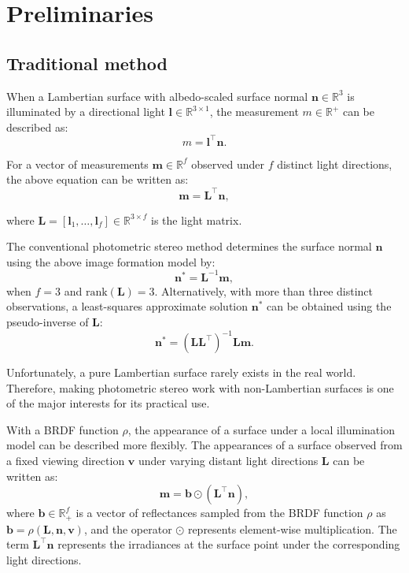 \section{Preliminaries}

\subsection{Traditional method}

When a Lambertian surface with albedo-scaled surface normal $\mathbf{n} \in \mathbb{R}^3$ is illuminated by a directional light $\mathbf{l} \in \mathbb{R}^{3 \times 1}$, the measurement $m \in \mathbb{R}^+$ can be described as:
\[ m = \mathbf{l}^\top \mathbf{n}. \]

For a vector of measurements $\mathbf{m} \in \mathbb{R}^f$ observed under $f$ distinct light directions, the above equation can be written as:
\[ \mathbf{m} = \mathbf{L}^\top \mathbf{n}, \]

where $\mathbf{L} = [\mathbf{l}_1, \ldots, \mathbf{l}_f] \in \mathbb{R}^{3 \times f}$ is the light matrix.

The conventional photometric stereo method determines the surface normal $\mathbf{n}$ using the above image formation model by:
\[ \mathbf{n}^* = \mathbf{L}^{-1} \mathbf{m}, \]
when $f = 3$ and $\text{rank}(\mathbf{L}) = 3$. Alternatively, with more than three distinct observations, a least-squares approximate solution $\mathbf{n}^*$ can be obtained using the pseudo-inverse of $\mathbf{L}$:
\[ \mathbf{n}^* = (\mathbf{L} \mathbf{L}^\top)^{-1} \mathbf{L} \mathbf{m}. \]

Unfortunately, a pure Lambertian surface rarely exists in the real world. Therefore, making photometric stereo work with non-Lambertian surfaces is one of the major interests for its practical use.

With a BRDF function $\rho$, the appearance of a surface under a local illumination model can be described more flexibly. The appearances of a surface observed from a fixed viewing direction $\mathbf{v}$ under varying distant light directions $\mathbf{L}$ can be written as:
\[ \mathbf{m} = \mathbf{b} \odot (\mathbf{L}^\top \mathbf{n}), \]
where $\mathbf{b} \in \mathbb{R}^f_+$ is a vector of reflectances sampled from the BRDF function $\rho$ as $\mathbf{b} = \rho(\mathbf{L}, \mathbf{n}, \mathbf{v})$, and the operator $\odot$ represents element-wise multiplication. The term $\mathbf{L}^\top \mathbf{n}$ represents the irradiances at the surface point under the corresponding light directions.

